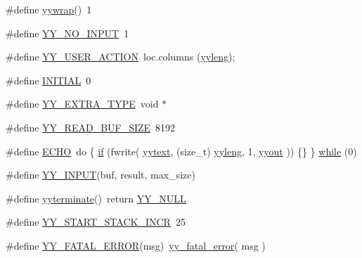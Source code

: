 \begin{DoxyCompactItemize}
\item 
\#define \hyperlink{_genesys_09_09-scanner_8cpp_ade1e2db9970733fbc3d9fecd09ce9771}{yywrap}()~1
\item 
\#define \hyperlink{_genesys_09_09-scanner_8cpp_a85523a0c7d95c059d251b4e9829947aa}{Y\-Y\-\_\-\-N\-O\-\_\-\-I\-N\-P\-U\-T}~1
\item 
\#define \hyperlink{_genesys_09_09-scanner_8cpp_a6198b2fcf96178b24ad4efff2a3debb0}{Y\-Y\-\_\-\-U\-S\-E\-R\-\_\-\-A\-C\-T\-I\-O\-N}~loc.\-columns (\hyperlink{_genesys_09_09-scanner_8cpp_a1b5865350b5ca5c1d69f429c2a652953}{yyleng});
\item 
\#define \hyperlink{_genesys_09_09-scanner_8cpp_aa3d063564f6ab16f6d408b8369d0e9ff}{I\-N\-I\-T\-I\-A\-L}~0
\item 
\#define \hyperlink{_genesys_09_09-scanner_8cpp_a26938d921de835f6183c02e54cf08828}{Y\-Y\-\_\-\-E\-X\-T\-R\-A\-\_\-\-T\-Y\-P\-E}~void $\ast$
\item 
\#define \hyperlink{_genesys_09_09-scanner_8cpp_aab1491ceccb1c95c14320b2903773a1c}{Y\-Y\-\_\-\-R\-E\-A\-D\-\_\-\-B\-U\-F\-\_\-\-S\-I\-Z\-E}~8192
\item 
\#define \hyperlink{_genesys_09_09-scanner_8cpp_aad1dc60a04a1d8cfc8b3ded13601e361}{E\-C\-H\-O}~do \{ \hyperlink{_genesys_09_09-scanner_8cpp_ad4a65b873df5c05570846b5413b41dfd}{if} (fwrite( \hyperlink{_genesys_09_09-scanner_8cpp_a35b96d819f6a8f8638894c429e68b02a}{yytext}, (size\-\_\-t) \hyperlink{_genesys_09_09-scanner_8cpp_a1b5865350b5ca5c1d69f429c2a652953}{yyleng}, 1, \hyperlink{_genesys_09_09-scanner_8cpp_a296847b42b0baa62e2af36cb79f3c0eb}{yyout} )) \{\} \} \hyperlink{_genesys_09_09-scanner_8cpp_a8fdafe3be7e00ce3d4f0cb50a9a5eb39}{while} (0)
\item 
\#define \hyperlink{_genesys_09_09-scanner_8cpp_aacfdca45fa4beb8b06172525a53c424a}{Y\-Y\-\_\-\-I\-N\-P\-U\-T}(buf, result, max\-\_\-size)
\item 
\#define \hyperlink{_genesys_09_09-scanner_8cpp_ac3286b18a2e91b4571b97df96a118e84}{yyterminate}()~return \hyperlink{_genesys_09_09-scanner_8cpp_a8e0bcf8f8a5b613ea583347f8bc31cbf}{Y\-Y\-\_\-\-N\-U\-L\-L}
\item 
\#define \hyperlink{_genesys_09_09-scanner_8cpp_a227e75c43b9e0cd41529974230be7e75}{Y\-Y\-\_\-\-S\-T\-A\-R\-T\-\_\-\-S\-T\-A\-C\-K\-\_\-\-I\-N\-C\-R}~25
\item 
\#define \hyperlink{_genesys_09_09-scanner_8cpp_ac0586b8b0b092d02f4ba7d45abe328f2}{Y\-Y\-\_\-\-F\-A\-T\-A\-L\-\_\-\-E\-R\-R\-O\-R}(msg)~\hyperlink{_genesys_09_09-scanner_8cpp_a25d1992696acab2c6c3b6a6b45d2f487}{yy\-\_\-fatal\-\_\-error}( msg )

\end{DoxyCompactItemize}
